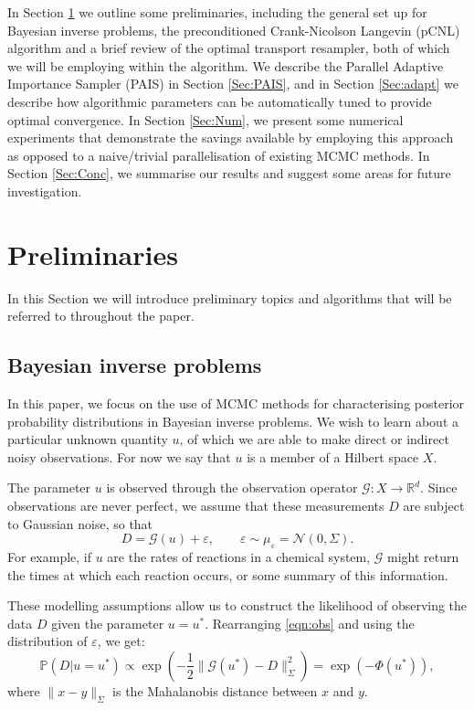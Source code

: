\documentclass[final]{siamltex}
\newcommand{\G}{\mathcal{G}}
\newcommand{\data}{D}
\begin{document}
In Section \ref{Sec:Prelim} we outline some preliminaries,
including the general set up for Bayesian inverse problems, the
preconditioned Crank-Nicolson Langevin (pCNL) algorithm and a
brief review of the optimal transport resampler,  both of which we will be
employing within the algorithm. We describe the Parallel Adaptive
Importance Sampler (PAIS) in Section \ref{Sec:PAIS}, and in Section
\ref{Sec:adapt} we describe how algorithmic parameters can be
automatically tuned to provide optimal convergence. In
Section \ref{Sec:Num}, we present some numerical experiments that
demonstrate the savings available by employing this approach as
opposed to a naive/trivial parallelisation of existing MCMC
methods. In Section \ref{Sec:Conc}, we summarise our results and
suggest some areas for future investigation.










\section{Preliminaries}\label{Sec:Prelim}
In this Section we will introduce preliminary topics and algorithms
that will be referred to throughout the paper.
\subsection{Bayesian inverse problems}
In this paper, we focus on the use of MCMC methods for characterising
posterior probability distributions in Bayesian inverse problems. We
wish to learn about a particular unknown quantity $u$, of which we are
able to make direct or indirect noisy observations. For now
we say that $u$ is a member of a Hilbert
space $X$. 

The parameter $u$ is observed
through the observation operator $\mathcal{G}:X \to\mathbb{R}^d$. 
Since observations are never perfect, we
assume that these measurements $\data$ are subject to Gaussian noise, so that
\begin{equation}\label{eqn:obs}
	\data = \mathcal{G}(u) + \varepsilon, \qquad \varepsilon \sim \mu_{\varepsilon} = \mathcal{N}(0,\Sigma).
\end{equation}
For example, if $u$ are the rates of reactions in a chemical system, $\G$ might return the times at which each reaction occurs, or some summary of this information.

These modelling assumptions allow us to construct the 
likelihood of observing the data $\data$ given the parameter $u =
u^*$. Rearranging \eqref{eqn:obs} and using the distribution of $\varepsilon$, we get:
\begin{equation}\label{eqn:like}
	\mathbb{P}(\data|u=u^*) \propto \exp \left ( -\frac{1}{2} \|\mathcal{G}(u^*)
	  - \data\|_\Sigma^2 \right ) = \exp\left(-\Phi(u^*)\right),
\end{equation}
where $\| x - y \|_\Sigma$ is the Mahalanobis distance between $x$ and $y$.
\end{document}
